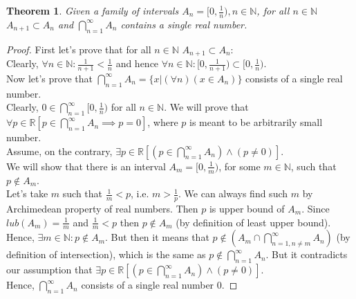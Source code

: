 \documentclass[11pt]{article}
\begin{document}
   \newtheorem*{Theorem}{Theorem}
   \begin{Theorem}
       Given a family of intervals $A_{n} = [0, \frac{1}{n}), n \in \mathbb{N}$, for all $n \in \mathbb{N}$ $A_{n+1} \subset A_{n}$  and
       $\displaystyle\bigcap_{n = 1}^{\infty}A_{n}$ contains a single real number.
   \end{Theorem}
   \begin{proof}
   First let's prove that for all $n \in \mathbb{N}$ $A_{n+1} \subset A_{n}$:\\
   Clearly, $\forall n \in \mathbb{N}: \frac{1}{n+1} < \frac{1}{n}$ and hence $\forall n \in \mathbb{N}: [0, \frac{1}{n+1}) \subset [0, \frac{1}{n})$.\\
   Now let's prove that $\displaystyle\bigcap_{n = 1}^{\infty}A_{n} = \{x|(\forall n)(x \in A_{n})\}$ consists of a single real number.\\
   Clearly, $0 \in \displaystyle\bigcap_{n = 1}^{\infty}[0, \frac{1}{n})$ for all $n \in \mathbb{N}$.
   We will prove that $\forall p \in \mathbb{R} \left[ p \in \displaystyle\bigcap_{n = 1}^{\infty}A_{n} \implies p = 0 \right]$, where $p$  is meant to be arbitrarily small number.\\
   Assume, on the contrary, $\exists p \in \mathbb{R} \left[ \left(p \in \displaystyle\bigcap_{n = 1}^{\infty}A_{n} \right) \land (p \neq 0 )\right]$.\\
   We will show that there is an interval $A_{m} = [0, \frac{1}{m})$, for some $m \in \mathbb{N}$, such that $p \notin A_{m}$.\\
   Let's take $m$ such that $\frac{1}{m} < p$, i.e. $m > \frac{1}{p}$. We can always find such $m$ by Archimedean property of real numbers.
   Then $p$ is upper bound of $A_{m}$.
   Since $lub(A_{m}) = \frac{1}{m}$ and $\frac{1}{m} < p$ then $p \notin A_{m}$ (by definition of least upper bound). \\
   Hence, $\exists m \in \mathbb{N}: p \notin A_{m}$.
   But then it means that $p \notin \left( A_{m} \cap \displaystyle\bigcap_{n = 1, n \neq m}^{\infty}A_{n} \right)$ (by definition of intersection),
   which is the same as $p \notin \displaystyle\bigcap_{n = 1}^{\infty}A_{n}$.
   But it contradicts our assumption that $\exists p \in \mathbb{R} \left[ \left(p \in \displaystyle\bigcap_{n = 1}^{\infty}A_{n} \right) \land (p \neq 0 )\right]$.\\
   Hence, $\displaystyle\bigcap_{n = 1}^{\infty}A_{n}$  consists of a single real number 0.
   \end{proof}
\end{document}
